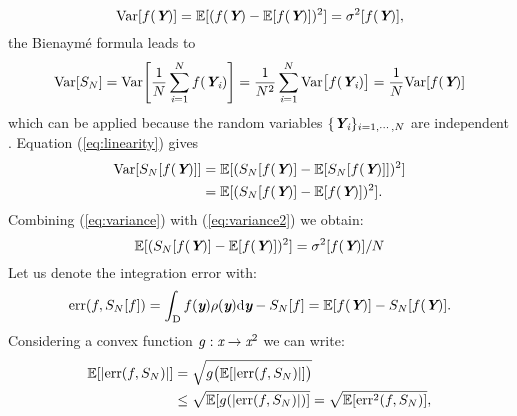 \begin{equation}\textrm{Var}[f(\textit{\textbf{Y}})]=\mathbb{E}[(f(\textit{\textbf{Y}})-\mathbb{E}[f(\textit{\textbf{Y}})])^2] = \sigma^2[f(\textit{\textbf{Y}})],
\end{equation}
the Bienaym\'e formula
leads to
\begin{equation}\label{eq:variance}
\textrm{Var}[S_{N}]= \textrm{Var}\Bigg[\frac{1}{N}\sum_{\textit{i}=1}^{N}f(\textit{\textbf{Y}}_{\textit{i}})\Bigg] =
 \frac{1}{N^2}\sum_{\textit{i}=1}^{N}\textrm{Var}\big[f(\textit{\textbf{Y}}_{\textit{i}})\big] = \frac{1}{N}\textrm{Var}[f(\textit{\textbf{Y}})]
\end{equation}
which can be applied because the random variables $\{\textit{\textbf{Y}}_{\textit{i}}\}_{i = 1, \cdots, N}$ are independent \cite{grinstead2012introduction}. 
Equation (\ref{eq:linearity}) gives
\begin{equation}\label{eq:variance2}
\begin{aligned}
\textrm{Var}[S_N[f(\textit{\textbf{Y}})]] &= \mathbb{E}[(S_{N}[f(\textit{\textbf{Y}})]-\mathbb{E}[S_{N}[f(\textit{\textbf{Y}})]])^2]\\ &= \mathbb{E}[(S_{N}[f(\textit{\textbf{Y}})]-\mathbb{E}[f(\textit{\textbf{Y}})])^2].
\end{aligned}
\end{equation}
Combining (\ref{eq:variance}) with (\ref{eq:variance2}) we obtain:
\begin{equation}\label{eq:variance3}
\mathbb{E}[(S_{N}[f(\textit{\textbf{Y}})]-\mathbb{E}[f(\textit{\textbf{Y}})])^2] = \sigma^2[f(\textit{\textbf{Y}})]/N
\end{equation}
Let us denote the integration error with:
\begin{equation}\label{eq:error1}
\textrm{err}(f, S_{N}[f]) =\int_{\textup{D}}f(\textit{\textbf{y}})\rho(\textit{\textbf{y}}) \textrm{d}\textit{\textbf{y}}-S_{N}[f] = \mathbb{E}[f(\textit{\textbf{Y}})]-S_N[f(\textit{\textbf{Y}})].
\end{equation}
Considering a convex function $g:\textit{x}\rightarrow\textit{x}^2$ we can write:
\begin{equation}
\begin{aligned}
\mathbb{E}[|\textrm{err}(f, S_{N})|] &= \sqrt{g\big(\mathbb{E}[|\textrm{err}(f, S_{N})|]\big)} \\&\leq\sqrt{\mathbb{E}[g(|\textrm{err}(f, S_{N})|)]} = \sqrt{\mathbb{E}[\textrm{err}^2(f, S_{N})]},
\end{aligned}
\end{equation} 
